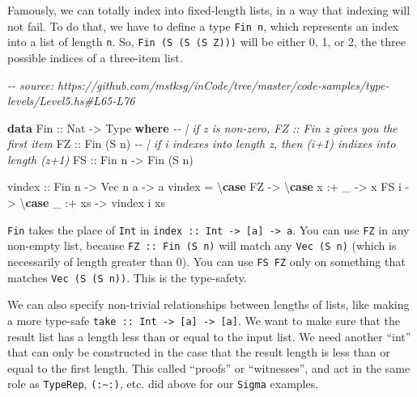 \documentclass[]{article}
\newenvironment{Shaded}{}{}
\newcommand{\CommentTok}[1]{\textcolor[rgb]{0.38,0.63,0.69}{\textit{#1}}}
\newcommand{\DataTypeTok}[1]{\textcolor[rgb]{0.56,0.13,0.00}{#1}}
\newcommand{\KeywordTok}[1]{\textcolor[rgb]{0.00,0.44,0.13}{\textbf{#1}}}
\newcommand{\NormalTok}[1]{#1}
\newcommand{\OperatorTok}[1]{\textcolor[rgb]{0.40,0.40,0.40}{#1}}
\newcommand{\OtherTok}[1]{\textcolor[rgb]{0.00,0.44,0.13}{#1}}
\begin{document}
Famously, we can totally index into fixed-length lists, in a way that indexing
will not fail. To do that, we have to define a type \texttt{Fin\ n}, which
represents an index into a list of length \texttt{n}. So,
\texttt{Fin\ (S\ (S\ (S\ Z)))} will be either 0, 1, or 2, the three possible
indices of a three-item list.

\begin{Shaded}
\begin{Highlighting}[]
\CommentTok{{-}{-} source: https://github.com/mstksg/inCode/tree/master/code{-}samples/type{-}levels/Level5.hs\#L65{-}L76}

\KeywordTok{data} \DataTypeTok{Fin}\OtherTok{ ::} \DataTypeTok{Nat} \OtherTok{{-}\textgreater{}} \DataTypeTok{Type} \KeywordTok{where}
  \CommentTok{{-}{-} | if z is non{-}zero, FZ :: Fin z gives you the first item}
  \DataTypeTok{FZ}\OtherTok{ ::} \DataTypeTok{Fin}\NormalTok{ (}\DataTypeTok{\textquotesingle{}S}\NormalTok{ n)}
  \CommentTok{{-}{-} | if i indexes into length z, then (i+1) indixes into length (z+1)}
  \DataTypeTok{FS}\OtherTok{ ::} \DataTypeTok{Fin}\NormalTok{ n }\OtherTok{{-}\textgreater{}} \DataTypeTok{Fin}\NormalTok{ (}\DataTypeTok{\textquotesingle{}S}\NormalTok{ n)}

\OtherTok{vindex ::} \DataTypeTok{Fin}\NormalTok{ n }\OtherTok{{-}\textgreater{}} \DataTypeTok{Vec}\NormalTok{ n a }\OtherTok{{-}\textgreater{}}\NormalTok{ a}
\NormalTok{vindex }\OtherTok{=}\NormalTok{ \textbackslash{}}\KeywordTok{case}
  \DataTypeTok{FZ} \OtherTok{{-}\textgreater{}}\NormalTok{ \textbackslash{}}\KeywordTok{case}
\NormalTok{    x }\OperatorTok{:+}\NormalTok{ \_ }\OtherTok{{-}\textgreater{}}\NormalTok{ x}
  \DataTypeTok{FS}\NormalTok{ i }\OtherTok{{-}\textgreater{}}\NormalTok{ \textbackslash{}}\KeywordTok{case}
\NormalTok{    \_ }\OperatorTok{:+}\NormalTok{ xs }\OtherTok{{-}\textgreater{}}\NormalTok{ vindex i xs}
\end{Highlighting}
\end{Shaded}

\texttt{Fin} takes the place of \texttt{Int} in
\texttt{index\ ::\ Int\ -\textgreater{}\ {[}a{]}\ -\textgreater{}\ a}. You can
use \texttt{FZ} in any non-empty list, because \texttt{FZ\ ::\ Fin\ (S\ n)} will
match any \texttt{Vec\ (S\ n)} (which is necessarily of length greater than 0).
You can use \texttt{FS\ FZ} only on something that matches
\texttt{Vec\ (S\ (S\ n))}. This is the type-safety.

We can also specify non-trivial relationships between lengths of lists, like
making a more type-safe
\texttt{take\ ::\ Int\ -\textgreater{}\ {[}a{]}\ -\textgreater{}\ {[}a{]}}. We
want to make sure that the result list has a length less than or equal to the
input list. We need another ``int'' that can only be constructed in the case
that the result length is less than or equal to the first length. This called
``proofs'' or ``witnesses'', and act in the same role as \texttt{TypeRep},
\texttt{(:\textasciitilde{}:)}, etc. did above for our \texttt{Sigma} examples.
\end{document}
